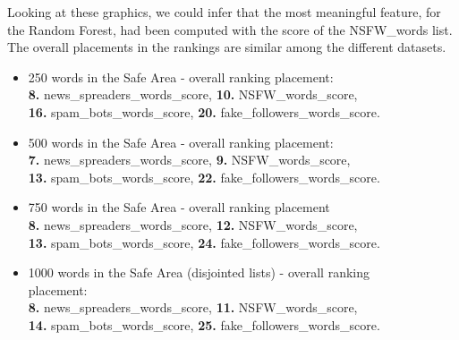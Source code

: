 Looking at these graphics, we could infer that the most meaningful feature, for the Random Forest, had been computed with the score of the NSFW\_words list.
The overall placements in the rankings are similar among the different datasets.
\begin{itemize}
	\item[\PencilRight]250 words in the Safe Area - overall ranking placement:\\
	\textbf{8.} news\_spreaders\_words\_score, \textbf{10.} NSFW\_words\_score,\\ \textbf{16.} spam\_bots\_words\_score, \textbf{20.} fake\_followers\_words\_score.
	
	\item[\PencilRight]500 words in the Safe Area - overall ranking placement:\\
	\textbf{7.} news\_spreaders\_words\_score, \textbf{9.} NSFW\_words\_score,\\ \textbf{13.} spam\_bots\_words\_score, \textbf{22.} fake\_followers\_words\_score.
	
	\item[\PencilRight]750 words in the Safe Area - overall ranking placement\\
	\textbf{8.} news\_spreaders\_words\_score, \textbf{12.} NSFW\_words\_score,\\ \textbf{13.} spam\_bots\_words\_score, \textbf{24.} fake\_followers\_words\_score.
	
	\item[\PencilRight]1000 words in the Safe Area (disjointed lists) - overall ranking\\ placement:\\
	\textbf{8.} news\_spreaders\_words\_score, \textbf{11.} NSFW\_words\_score,\\ \textbf{14.} spam\_bots\_words\_score, \textbf{25.} fake\_followers\_words\_score.
	
\end{itemize}


